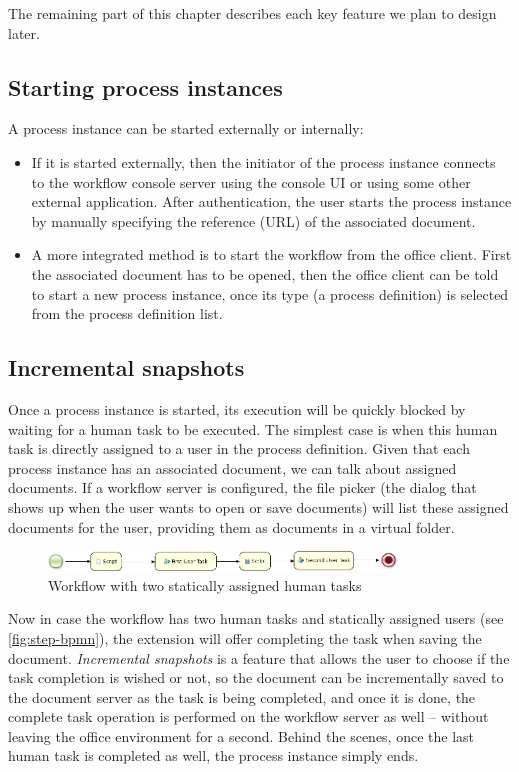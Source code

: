 The remaining part of this chapter describes each key feature we plan to design
later.

\subsection*{Starting process instances}

A process instance can be started externally or internally:

\begin{itemize}
\item If it is started externally, then the initiator of the process instance
connects to the workflow console server using the console UI or using some
other external application. After authentication, the user starts the process
instance by manually specifying the reference (URL) of the associated document.
\item A more integrated method is to start the workflow from the office client.
First the associated document has to be opened, then the office client can be
told to start a new process instance, once its type (a process definition) is
selected from the process definition list.
\end{itemize}

\subsection*{Incremental snapshots}

Once a process instance is started, its execution will be quickly blocked by
waiting for a human task to be executed. The simplest case is when this human
task is directly assigned to a user in the process definition. Given that each
process instance has an associated document, we can talk about assigned
documents. If a workflow server is configured, the file picker (the dialog that
shows up when the user wants to open or save documents) will list these
assigned documents for the user, providing them as documents in a virtual
folder.

\begin{figure}[H]
\centering
\includegraphics[width=350px,keepaspectratio]{step-bpmn.png}
\caption{Workflow with two statically assigned human tasks}
\label{fig:step-bpmn}
\end{figure}

Now in case the workflow has two human tasks and statically assigned users (see
\autoref{fig:step-bpmn}), the extension will offer completing the task when saving the
document. \emph{Incremental snapshots} is a feature that allows the user to
choose if the task completion is wished or not, so the document can be
incrementally saved to the document server as the task is being completed, and
once it is done, the complete task operation is performed on the workflow
server as well -- without leaving the office environment for a second.  Behind
the scenes, once the last human task is completed as well, the process instance
simply ends.

